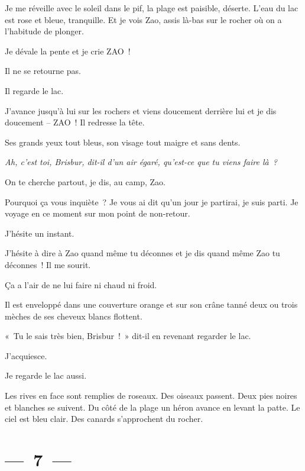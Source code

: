 \documentclass[french,twoside]{book} %
\begin{document}
\noindent Je me réveille avec le soleil dans le pif, la plage est paisible, déserte. L’eau du lac est rose et bleue, tranquille. Et je vois Zao, assis là-bas sur le rocher où on a l’habitude de plonger.\par
Je dévale la pente et je crie ZAO !\par
Il ne se retourne pas.\par
Il regarde le lac.\par
J’avance jusqu’à lui sur les rochers et viens doucement derrière lui et je dis doucement – ZAO ! Il redresse la tête.\par
Ses grands yeux tout bleus, son visage tout maigre et sans dents.\par
{\itshape Ah, c’est toi, Brisbur, dit-il d’un air égaré, qu’est-ce que tu viens faire là ?}\par
On te cherche partout, je dis, au camp, Zao.\par
Pourquoi ça vous inquiète ? Je vous ai dit qu’un jour je partirai, je suis parti. Je voyage en ce moment sur mon point de non-retour.\par
\bigbreak
J’hésite un instant.\par
J’hésite à dire à Zao quand même tu déconnes et je dis quand même Zao tu déconnes ! Il me sourit.\par
Ça a l’air de ne lui faire ni chaud ni froid.\par
Il est enveloppé dans une couverture orange et sur son crâne tanné deux ou trois mèches de ses cheveux blancs flottent.\par
« Tu le sais très bien, Brisbur ! » dit-il en revenant regarder le lac.\par
J’acquiesce.\par
Je regarde le lac aussi.\par
Les rives en face sont remplies de roseaux. Des oiseaux passent. Deux pies noires et blanches se suivent. Du côté de la plage un héron avance en levant la patte. Le ciel est bleu clair. Des canards s’approchent du rocher.

\section[{— 7 —}]{— 7 —}
\renewcommand{\leftmark}{— 7 —}
\end{document}
